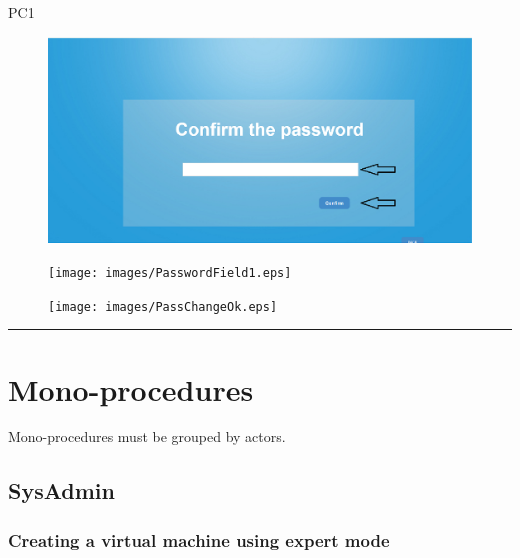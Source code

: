 \begin{lyxlist}{PC1}
\begin{figure}[H]
\centering
\includegraphics[width=170mm]{images/ComfirmField.eps}
\caption{\label{overflow}}
\end{figure}

\begin{figure}[H]
\centering
\texttt{[image: images/PasswordField1.eps]}
\caption{\label{overflow}}
\end{figure}

\begin{figure}[H]
\centering
\texttt{[image: images/PassChangeOk.eps]}
\caption{\label{overflow}}
\end{figure}


\end{lyxlist}
\hrule

\section{Mono-procedures}
Mono-procedures must be grouped by actors.





\subsection{SysAdmin}

\subsubsection{Creating a virtual machine using expert mode}

